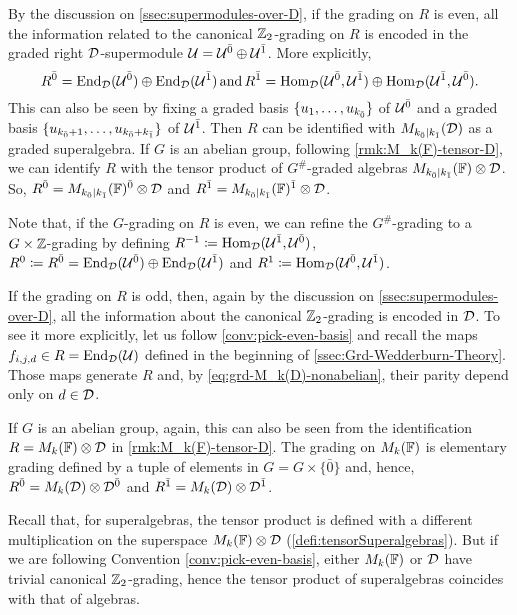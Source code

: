 By the discussion on \cref{ssec:supermodules-over-D}, if the grading on $R$ is even, all the information related to the canonical $\mathbb{Z}_2$-grading on $R$ is encoded in the graded right $\mathcal{D}$-supermodule $\mathcal U=\mathcal U^{\bar0} \oplus \mathcal U^{\bar1}$. 
More explicitly, 
\[\label{eq:almost-ZZ-grading}
    R^{\bar0} = \operatorname{End}_{\mathcal{D}}(\mathcal U^{\bar0}) \oplus \operatorname{End}_{\mathcal{D}}(\mathcal U^{\bar1}) \,\text{and}\, R^{\bar1} = \operatorname{Hom}_{\mathcal{D}}(\mathcal U^{\bar0}, \mathcal U^{\bar1}) \oplus \operatorname{Hom}_{\mathcal{D}}(\mathcal U^{\bar1}, \mathcal U^{\bar0}).
\]
This can also be seen by fixing a graded basis $\{u_1, \ldots, u_{k_{\bar{0}}}\}$ of $\mathcal U^{\bar0}$ and a graded basis $\{u_{k_{\bar{0}} + 1}, \ldots, u_{k_{\bar{0}} + k_{\bar{1}}}\}$ of $\mathcal U^{\bar1}$. 
Then $R$ can be identified with $M_{k_{\bar{0}} \mid k_{\bar{1}}}(\mathcal{D})$ as a graded superalgebra. 
If $G$ is an abelian group, following \cref{rmk:M_k(F)-tensor-D}, we can identify $R$ with the tensor product of $G^\#$-graded algebras $M_{k_{\bar{0}} \mid k_{\bar{1}}}(\mathbb{F})\otimes \mathcal{D}$. 
So, $R^{\bar0} = M_{k_{\bar{0}} \mid k_{\bar{1}}}(\mathbb{F})^{\bar0} \otimes \mathcal{D}$ and $R^{\bar1} = M_{k_{\bar{0}} \mid k_{\bar{1}}}(\mathbb{F})^{\bar1} \otimes \mathcal{D}$. 

\begin{remark}\label{rmk:even-ZZ-grading}
    Note that, if the $G$-grading on $R$ is even, we can refine the $G^\#$-grading to a $G\times \mathbb{Z}$-grading by defining $R^{-1} \coloneqq \operatorname{Hom}_{\mathcal{D}} (\mathcal U^{\bar1}, \mathcal U^{\bar0})$, $R^0 \coloneqq R^{\bar0} = \operatorname{End}_{\mathcal{D}}(\mathcal U^{\bar0}) \oplus \operatorname{End}_{\mathcal{D}}(\mathcal U^{\bar1})$ and $R^1 \coloneqq \operatorname{Hom}_{\mathcal{D}} (\mathcal U^{\bar0}, \mathcal U^{\bar1})$. 
\end{remark}

If the grading on $R$ is odd, then, again by the discussion on \cref{ssec:supermodules-over-D}, all the information about the canonical $\mathbb{Z}_2$-grading is encoded in $\mathcal{D}$. 
To see it more explicitly, let us follow \cref{conv:pick-even-basis} and recall the maps $f_{i, j, d} \in R = \operatorname{End}_{\mathcal{D}} (\mathcal U)$ defined in the beginning of \cref{ssec:Grd-Wedderburn-Theory}. 
Those maps generate $R$ and, by \cref{eq:grd-M_k(D)-nonabelian}, their parity depend only on $d \in \mathcal{D}$. 

If $G$ is an abelian group, again, this can also be seen from the identification $R = M_k(\mathbb{F})\otimes \mathcal{D}$ in \cref{rmk:M_k(F)-tensor-D}. 
The grading on $M_k(\mathbb{F})$ is elementary grading defined by a tuple of elements in $G = G \times \{ \bar 0 \}$ and, hence, $R^{\bar0} = M_k(\mathcal{D}) \otimes \mathcal{D}^{\bar0}$ and $R^{\bar1} = M_k(\mathcal{D}) \otimes \mathcal{D}^{\bar1}$. 

\begin{remark}\label{rmk:M(D)=M(FF)-tensor-D}
	Recall that, for superalgebras, the tensor product is defined with a different multiplication on the superspace $M_k(\mathbb{F})\otimes \mathcal{D}$ (\cref{defi:tensorSuperalgebras}). 
	But if we are following Convention \ref{conv:pick-even-basis}, either $M_k(\mathbb{F})$ or $\mathcal{D}$ have trivial canonical $\mathbb{Z}_2$-grading, hence the tensor product of superalgebras coincides with that of algebras.
\end{remark}

